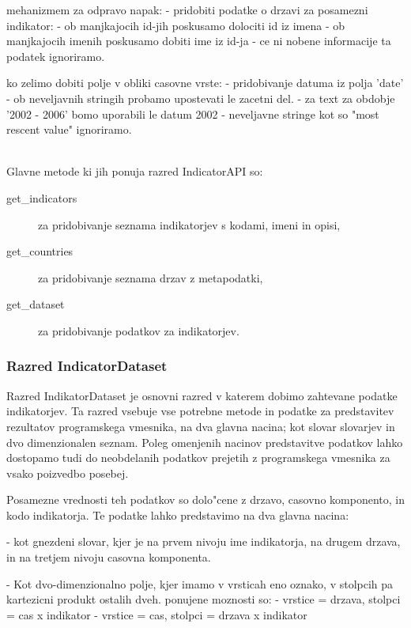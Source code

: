 mehanizmem za odpravo napak:
 - pridobiti podatke o drzavi za posamezni indikator: 
   - ob manjkajocih id-jih poskusamo dolociti id iz imena
   - ob manjkajocih imenih poskusamo dobiti ime iz id-ja
   - ce ni nobene informacije ta podatek ignoriramo.

  ko zelimo dobiti polje v obliki casovne vrste:
   - pridobivanje datuma iz polja 'date'
     - ob neveljavnih stringih probamo upostevati le zacetni del.
       - za text za  obdobje  '2002 - 2006' bomo uporabili le datum 2002 
     - neveljavne stringe kot so "most rescent value" ignoriramo.




\ \\
Glavne metode ki jih ponuja razred IndicatorAPI so:

\begin{description}  
\item [get\_indicators] za pridobivanje seznama indikatorjev s kodami, imeni
      in opisi,
\item [get\_countries] za pridobivanje seznama drzav z metapodatki,
\item [get\_dataset] za pridobivanje podatkov za indikatorjev.
\end{description}








\subsubsection{Razred IndicatorDataset}

Razred IndikatorDataset je osnovni razred v katerem dobimo zahtevane podatke
indikatorjev. Ta razred vsebuje vse potrebne metode in podatke za predstavitev
rezultatov programskega vmesnika, na dva glavna nacina; kot slovar slovarjev in
dvo dimenzionalen seznam. Poleg omenjenih nacinov predstavitve podatkov lahko
dostopamo tudi do neobdelanih podatkov prejetih z programskega vmesnika za
vsako poizvedbo posebej.


Posamezne vrednosti teh podatkov so dolo"cene z drzavo, casovno komponento, in
kodo indikatorja. Te podatke lahko predstavimo na dva glavna nacina:

 - kot gnezdeni slovar, kjer je na prvem nivoju ime indikatorja, na drugem
   drzava, in na tretjem nivoju casovna komponenta.

 - Kot dvo-dimenzionalno polje, kjer imamo v vrsticah eno oznako, v stolpcih
   pa kartezicni produkt ostalih dveh. ponujene moznosti so:
   - vrstice = drzava, stolpci = cas x indikator
   - vrstice = cas, stolpci = drzava x indikator


